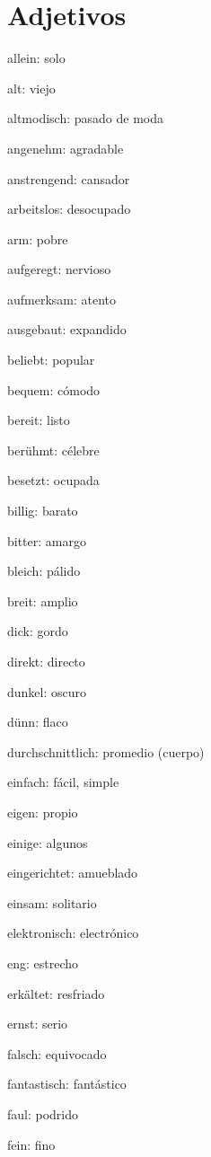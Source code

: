 \section{Adjetivos}
\begin{multicols}{3}
\begin{myitemize}
\item allein: solo
\item alt: viejo
\item altmodisch: pasado de moda
\item angenehm: agradable
\item anstrengend: cansador
\item arbeitslos: desocupado
\item arm: pobre
\item aufgeregt: nervioso
\item aufmerksam: atento
\item ausgebaut: expandido
\item beliebt: popular
\item bequem: cómodo
\item bereit: listo
\item berühmt: célebre
\item besetzt: ocupada
\item billig: barato
\item bitter: amargo
\item bleich: pálido
\item breit: amplio
\item dick: gordo
\item direkt: directo
\item dunkel: oscuro
\item dünn: flaco
\item durchschnittlich: promedio (cuerpo)
\item einfach: fácil, simple
\item eigen: propio
\item einige: algunos
\item eingerichtet: amueblado
\item einsam: solitario
\item elektronisch: electrónico
\item eng: estrecho
\item erkältet: resfriado
\item ernst: serio
\item falsch: equivocado
\item fantastisch: fantástico
\item faul: podrido
\item fein: fino

\end{myitemize}
\end{multicols}
